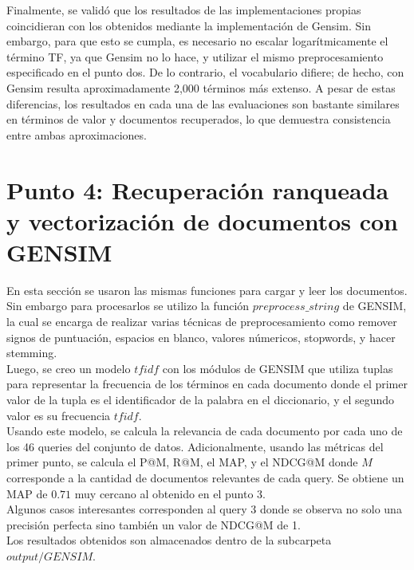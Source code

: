 \documentclass[11pt,english]{article}
\theoremstyle{plain}
\begin{document}
\noindent Finalmente, se validó que los resultados de las implementaciones propias coincidieran con los obtenidos mediante la implementación de Gensim. Sin embargo, para que esto se cumpla, es necesario no escalar logarítmicamente el término TF, ya que Gensim no lo hace, y utilizar el mismo preprocesamiento especificado en el punto dos. De lo contrario, el vocabulario difiere; de hecho, con Gensim resulta aproximadamente 2,000 términos más extenso. A pesar de estas diferencias, los resultados en cada una de las evaluaciones son bastante similares en términos de valor y documentos recuperados, lo que demuestra consistencia entre ambas aproximaciones.\\


\section*{Punto 4: Recuperación ranqueada y vectorización de documentos con GENSIM}

En esta sección se usaron las mismas funciones para cargar y leer los documentos. Sin embargo para procesarlos se utilizo la función $preprocess\_string$ de GENSIM, la cual se encarga de realizar varias técnicas de preprocesamiento como remover signos de puntuación, espacios en blanco, valores númericos, stopwords, y hacer stemming.\\

\noindent Luego, se creo un modelo $tfidf$ con los módulos de GENSIM que utiliza tuplas para representar la frecuencia de los términos en cada documento donde el primer valor de la tupla es el identificador de la palabra en el diccionario, y el segundo valor es su frecuencia $tfidf$. \\

\noindent Usando este modelo, se calcula la relevancia de cada documento por cada uno de los 46 queries del conjunto de datos. Adicionalmente, usando las métricas del primer punto, se calcula el P@M, R@M, el MAP, y el NDCG@M donde $M$ corresponde a la cantidad de documentos relevantes de cada query. Se obtiene un MAP de $0.71$ muy cercano al obtenido en el punto 3. \\

\noindent Algunos casos interesantes corresponden al query 3 donde se observa no solo una precisión perfecta sino también un valor de NDCG@M de 1. \\

\noindent Los resultados obtenidos son almacenados dentro de la subcarpeta $output/GENSIM$.

\printbibliography
\end{document}
